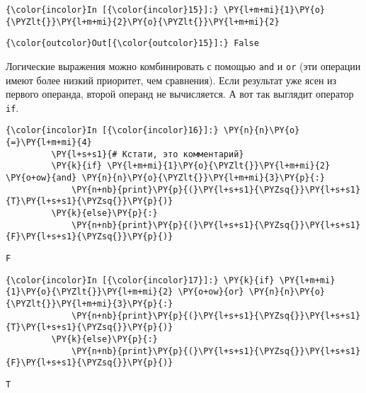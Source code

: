     \begin{Verbatim}[commandchars=\\\{\}]
{\color{incolor}In [{\color{incolor}15}]:} \PY{l+m+mi}{1}\PY{o}{\PYZlt{}}\PY{l+m+mi}{2}\PY{o}{\PYZlt{}}\PY{l+m+mi}{2}
\end{Verbatim}

            \begin{Verbatim}[commandchars=\\\{\}]
{\color{outcolor}Out[{\color{outcolor}15}]:} False
\end{Verbatim}
        
    Логические выражения можно комбинировать с помощью \texttt{and} и
\texttt{or} (эти операции имеют более низкий приоритет, чем сравнения).
Если результат уже ясен из первого операнда, второй операнд не
вычисляется. А вот так выглядит оператор \texttt{if}.

    \begin{Verbatim}[commandchars=\\\{\}]
{\color{incolor}In [{\color{incolor}16}]:} \PY{n}{n}\PY{o}{=}\PY{l+m+mi}{4}
         \PY{l+s+s1}{# Кстати, это комментарий}
         \PY{k}{if} \PY{l+m+mi}{1}\PY{o}{\PYZlt{}}\PY{l+m+mi}{2} \PY{o+ow}{and} \PY{n}{n}\PY{o}{\PYZlt{}}\PY{l+m+mi}{3}\PY{p}{:}
             \PY{n+nb}{print}\PY{p}{(}\PY{l+s+s1}{\PYZsq{}}\PY{l+s+s1}{T}\PY{l+s+s1}{\PYZsq{}}\PY{p}{)}
         \PY{k}{else}\PY{p}{:}
             \PY{n+nb}{print}\PY{p}{(}\PY{l+s+s1}{\PYZsq{}}\PY{l+s+s1}{F}\PY{l+s+s1}{\PYZsq{}}\PY{p}{)}
\end{Verbatim}

    \begin{Verbatim}[commandchars=\\\{\}]
F

    \end{Verbatim}

    \begin{Verbatim}[commandchars=\\\{\}]
{\color{incolor}In [{\color{incolor}17}]:} \PY{k}{if} \PY{l+m+mi}{1}\PY{o}{\PYZlt{}}\PY{l+m+mi}{2} \PY{o+ow}{or} \PY{n}{n}\PY{o}{\PYZlt{}}\PY{l+m+mi}{3}\PY{p}{:}
             \PY{n+nb}{print}\PY{p}{(}\PY{l+s+s1}{\PYZsq{}}\PY{l+s+s1}{T}\PY{l+s+s1}{\PYZsq{}}\PY{p}{)}
         \PY{k}{else}\PY{p}{:}
             \PY{n+nb}{print}\PY{p}{(}\PY{l+s+s1}{\PYZsq{}}\PY{l+s+s1}{F}\PY{l+s+s1}{\PYZsq{}}\PY{p}{)}
\end{Verbatim}

    \begin{Verbatim}[commandchars=\\\{\}]
T

    \end{Verbatim}

